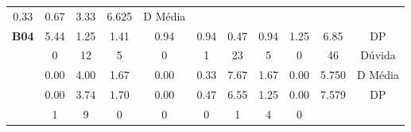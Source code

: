 \begin{table}[htbp]
\begin{tabular}{|ccccccccccc|}
		\multicolumn{1}{c|}{\cellcolor[HTML]{D9D9D9}0.33} &
		\multicolumn{1}{c|}{\cellcolor[HTML]{D9D9D9}0.67} &
		\multicolumn{1}{c|}{\cellcolor[HTML]{D9D9D9}3.33} &
		\multicolumn{1}{c|}{\cellcolor[HTML]{D9D9D9}6.625} &
		D Média \\ \cline{2-11} 
		\multicolumn{1}{|c|}{\multirow{-3}{*}{\cellcolor[HTML]{F2F2F2}\textbf{B04}}} &
		\multicolumn{1}{c|}{5.44} &
		\multicolumn{1}{c|}{1.25} &
		\multicolumn{1}{c|}{1.41} &
		\multicolumn{1}{c|}{0.94} &
		\multicolumn{1}{c|}{0.94} &
		\multicolumn{1}{c|}{0.47} &
		\multicolumn{1}{c|}{0.94} &
		\multicolumn{1}{c|}{1.25} &
		\multicolumn{1}{c|}{6.85} &
		DP \\ \hline
		\rowcolor[HTML]{D9D9D9} 
		\multicolumn{1}{|c|}{\cellcolor[HTML]{F2F2F2}} &
		\multicolumn{1}{c|}{\cellcolor[HTML]{D9D9D9}0} &
		\multicolumn{1}{c|}{\cellcolor[HTML]{D9D9D9}12} &
		\multicolumn{1}{c|}{\cellcolor[HTML]{D9D9D9}5} &
		\multicolumn{1}{c|}{\cellcolor[HTML]{D9D9D9}0} &
		\multicolumn{1}{c|}{\cellcolor[HTML]{D9D9D9}1} &
		\multicolumn{1}{c|}{\cellcolor[HTML]{D9D9D9}23} &
		\multicolumn{1}{c|}{\cellcolor[HTML]{D9D9D9}5} &
		\multicolumn{1}{c|}{\cellcolor[HTML]{D9D9D9}0} &
		\multicolumn{1}{c|}{\cellcolor[HTML]{D9D9D9}46} &
		Dúvida \\ \cline{2-11} 
		\multicolumn{1}{|c|}{\cellcolor[HTML]{F2F2F2}} &
		\multicolumn{1}{c|}{0.00} &
		\multicolumn{1}{c|}{4.00} &
		\multicolumn{1}{c|}{1.67} &
		\multicolumn{1}{c|}{0.00} &
		\multicolumn{1}{c|}{0.33} &
		\multicolumn{1}{c|}{7.67} &
		\multicolumn{1}{c|}{1.67} &
		\multicolumn{1}{c|}{0.00} &
		\multicolumn{1}{c|}{5.750} &
		D Média \\ \cline{2-11} 
		\rowcolor[HTML]{D9D9D9} 
		\multicolumn{1}{|c|}{\multirow{-3}{*}{\cellcolor[HTML]{F2F2F2}\textbf{B05}}} &
		\multicolumn{1}{c|}{\cellcolor[HTML]{D9D9D9}0.00} &
		\multicolumn{1}{c|}{\cellcolor[HTML]{D9D9D9}3.74} &
		\multicolumn{1}{c|}{\cellcolor[HTML]{D9D9D9}1.70} &
		\multicolumn{1}{c|}{\cellcolor[HTML]{D9D9D9}0.00} &
		\multicolumn{1}{c|}{\cellcolor[HTML]{D9D9D9}0.47} &
		\multicolumn{1}{c|}{\cellcolor[HTML]{D9D9D9}6.55} &
		\multicolumn{1}{c|}{\cellcolor[HTML]{D9D9D9}1.25} &
		\multicolumn{1}{c|}{\cellcolor[HTML]{D9D9D9}0.00} &
		\multicolumn{1}{c|}{\cellcolor[HTML]{D9D9D9}7.579} &
		DP \\ \hline
		\multicolumn{1}{|c|}{\cellcolor[HTML]{F2F2F2}} &
		\multicolumn{1}{c|}{1} &
		\multicolumn{1}{c|}{9} &
		\multicolumn{1}{c|}{0} &
		\multicolumn{1}{c|}{0} &
		\multicolumn{1}{c|}{0} &
		\multicolumn{1}{c|}{1} &
		\multicolumn{1}{c|}{4} &
		\multicolumn{1}{c|}{0} &

\end{tabular}
\end{table}
